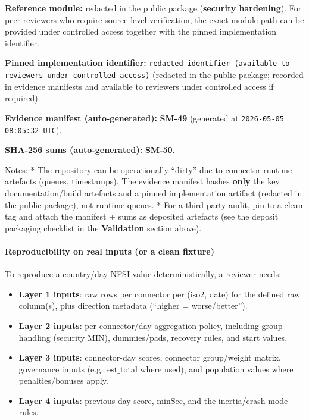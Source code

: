 \documentclass[
  11pt,
  peerreview,journal,onecolumn]{IEEEtran}
\newcommand{\passthrough}[1]{#1}
\providecommand{\tightlist}{%
  \setlength{\itemsep}{0pt}\setlength{\parskip}{0pt}}
\begin{document}
\textbf{Reference module:} redacted in the public package
(\textbf{security hardening}). For peer reviewers who require
source-level verification, the exact module path can be provided under
controlled access together with the pinned implementation identifier.

\textbf{Pinned implementation identifier:}
\passthrough{\lstinline!redacted identifier (available to reviewers under controlled access)!}
(redacted in the public package; recorded in evidence manifests and
available to reviewers under controlled access if required).

\textbf{Evidence manifest (auto-generated):} \textbf{SM-49} (generated
at \passthrough{\lstinline!2026-05-05 08:05:32 UTC!}).

\textbf{SHA-256 sums (auto-generated):} \textbf{SM-50}.

Notes: * The repository can be operationally ``dirty'' due to connector
runtime artefacts (queues, timestamps). The evidence manifest hashes
\textbf{only} the key documentation/build artefacts and a pinned
implementation artifact (redacted in the public package), not runtime
queues. * For a third-party audit, pin to a clean tag and attach the
manifest + sums as deposited artefacts (see the deposit packaging
checklist in the \textbf{Validation} section above).

\hypertarget{reproducibility-on-real-inputs-or-a-clean-fixture}{%
\paragraph{Reproducibility on real inputs (or a clean
fixture)}\label{reproducibility-on-real-inputs-or-a-clean-fixture}}

To reproduce a country/day NFSI value deterministically, a reviewer
needs:

\begin{itemize}
\tightlist
\item
  \textbf{Layer 1 inputs}: raw rows per connector per (iso2, date) for
  the defined raw column(s), plus direction metadata (``higher =
  worse/better'').
\item
  \textbf{Layer 2 inputs}: per-connector/day aggregation policy,
  including group handling (security MIN), dummies/pads, recovery rules,
  and start values.
\item
  \textbf{Layer 3 inputs}: connector-day scores, connector group/weight
  matrix, governance inputs (e.g.~\(\mathrm{est\_total}\) where used),
  and population values where penalties/bonuses apply.
\item
  \textbf{Layer 4 inputs}: previous-day score, \(\mathrm{minSec}\), and
  the inertia/crash-mode rules.
\end{itemize}
\end{document}
